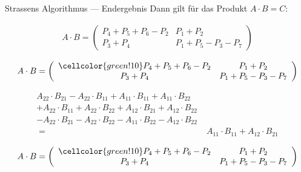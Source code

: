 \documentclass{beamer}
\begin{document}
\begin{frame}{Strassens Algorithmus --- Endergebnis}
Dann gilt für das Produkt $A\cdot B = C$:
\uncover<+-> {
 {
        \begin{align*}
            A\cdot B =
            \left(\begin{array}{cc}
                P_{4} + P_{5} + P_{6} - P_{2} & P_{1} + P_{2} \\
                P_{3} + P_{4} & P_{1} + P_{5} - P_{3} - P_{7} 
            \end{array}\right)
        \end{align*}} {
         {
            \begin{align*}
                A\cdot B =
                \left(\begin{array}{cc}
                    \cellcolor{green!10} P_{4} + P_{5} + P_{6} - P_{2} & P_{1} + P_{2} \\
                    P_{3} + P_{4} & P_{1} + P_{5} - P_{3} - P_{7} 
                \end{array}\right)
            \end{align*}
        
            \begin{align*}
                A_{22} \cdot B_{21} - A_{22} \cdot B_{11} + A_{11} \cdot B_{11} + A_{11} \cdot B_{22} \\ 
                + A_{22} \cdot B_{11} + A_{22} \cdot B_{22} + A_{12} \cdot B_{21} + A_{12} \cdot B_{22} \\ 
                - A_{22} \cdot B_{21} - A_{22} \cdot B_{22} - A_{11} \cdot B_{22} - A_{12} \cdot B_{22} \\
                \;= &\;A_{11} \cdot B_{11} + A_{12} \cdot B_{21}
            \end{align*}} {
         {
            \begin{align*}
                A\cdot B =
                \left(\begin{array}{cc}
                    \cellcolor{green!10} P_{4} + P_{5} + P_{6} - P_{2} & P_{1} + P_{2} \\
                    P_{3} + P_{4} & P_{1} + P_{5} - P_{3} - P_{7} 
                \end{array}\right)
            \end{align*}
            
}}}}
\end{frame}
\end{document}
